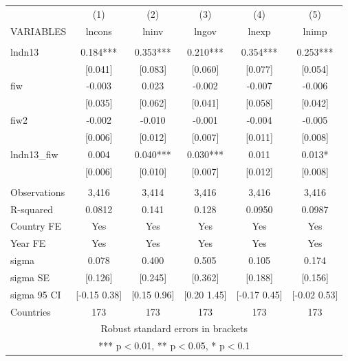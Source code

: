 \begin{tabular}{lccccc} \hline
 & (1) & (2) & (3) & (4) & (5) \\
VARIABLES & lncons & lninv & lngov & lnexp & lnimp \\ \hline
 &  &  &  &  &  \\
lndn13 & 0.184*** & 0.353*** & 0.210*** & 0.354*** & 0.253*** \\
 & [0.041] & [0.083] & [0.060] & [0.077] & [0.054] \\
fiw & -0.003 & 0.023 & -0.002 & -0.007 & -0.006 \\
 & [0.035] & [0.062] & [0.041] & [0.058] & [0.042] \\
fiw2 & -0.002 & -0.010 & -0.001 & -0.004 & -0.005 \\
 & [0.006] & [0.012] & [0.007] & [0.011] & [0.008] \\
lndn13\_fiw & 0.004 & 0.040*** & 0.030*** & 0.011 & 0.013* \\
 & [0.006] & [0.010] & [0.007] & [0.012] & [0.008] \\
 &  &  &  &  &  \\
Observations & 3,416 & 3,414 & 3,416 & 3,416 & 3,416 \\
R-squared & 0.0812 & 0.141 & 0.128 & 0.0950 & 0.0987 \\
Country FE & Yes & Yes & Yes & Yes & Yes \\
Year FE & Yes & Yes & Yes & Yes & Yes \\
sigma & 0.078 & 0.400 & 0.505 & 0.105 & 0.174 \\
sigma SE & [0.126] & [0.245] & [0.362] & [0.188] & [0.156] \\
sigma 95 CI & [-0.15 0.38] & [0.15 0.96] & [0.20 1.45] & [-0.17 0.45] & [-0.02 0.53] \\
 Countries & 173 & 173 & 173 & 173 & 173 \\ \hline
\multicolumn{6}{c}{ Robust standard errors in brackets} \\
\multicolumn{6}{c}{ *** p$<$0.01, ** p$<$0.05, * p$<$0.1} \\
\end{tabular}
